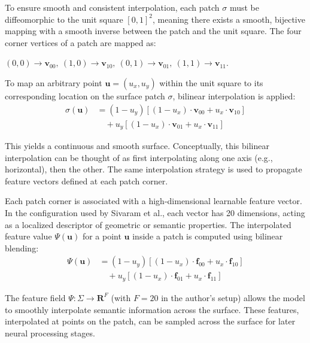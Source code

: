 To ensure smooth and consistent interpolation, each patch $\sigma$ must be diffeomorphic to the unit square $[0,1]^2$, meaning there exists a smooth, bijective mapping with a smooth inverse between the patch and the unit square.  
The four corner vertices of a patch are mapped as:

$(0,0) \rightarrow \mathbf{v}_{00},\ (1,0) \rightarrow \mathbf{v}_{10},\ (0,1) \rightarrow \mathbf{v}_{01},\ (1,1) \rightarrow \mathbf{v}_{11}$.  

To map an arbitrary point $\mathbf{u} = (u_x, u_y)$ within the unit square to its corresponding location on the surface patch $\sigma$, bilinear interpolation is applied:
\begin{equation}
\begin{aligned}
\sigma(\mathbf{u}) &= (1 - u_y) \left[ (1 - u_x) \cdot \mathbf{v}_{00} + u_x \cdot \mathbf{v}_{10} \right] \\
&\quad + u_y \left[ (1 - u_x) \cdot \mathbf{v}_{01} + u_x \cdot \mathbf{v}_{11} \right]
\end{aligned}
\label{func1}
\end{equation}

This yields a continuous and smooth surface.  
Conceptually, this bilinear interpolation can be thought of as first interpolating along one axis (e.g., horizontal), then the other.  
The same interpolation strategy is used to propagate feature vectors defined at each patch corner.  

Each patch corner is associated with a high-dimensional learnable feature vector.  
In the configuration used by Sivaram et al., each vector has 20 dimensions, acting as a localized descriptor of geometric or semantic properties.  
The interpolated feature value $\Psi(\mathbf{u})$ for a point $\mathbf{u}$ inside a patch is computed using bilinear blending:
\begin{equation}
\begin{aligned}
\Psi(\mathbf{u}) &= (1 - u_y) \left[ (1 - u_x) \cdot \mathbf{f}_{00} + u_x \cdot \mathbf{f}_{10} \right] \\
&\quad + u_y \left[ (1 - u_x) \cdot \mathbf{f}_{01} + u_x \cdot \mathbf{f}_{11} \right]
\end{aligned}
\label{func2}
\end{equation}

The feature field $\Psi: \Sigma \rightarrow \mathbf{R}^F$ (with $F = 20$ in the author's setup) allows the model to smoothly interpolate semantic information across the surface.  
These features, interpolated at points on the patch, can be sampled across the surface for later neural processing stages.  

